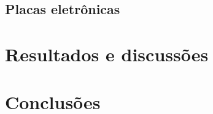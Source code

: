 \documentclass[
	12pt,				%
	openany,			%
	twoside,			%
	a4paper,			%
	english,			%
	french,				%
	spanish,			%
	brazil,				%
	oldfontcommands
	]{abntex2}
\begin{document}
\section{Placas eletrônicas}



\chapter{Resultados e discussões}

\chapter{Conclusões}


\end{document}
